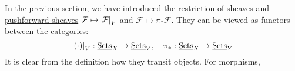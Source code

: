 \documentclass{article}
\begin{document}
\begin{remark}
    In the previous section, we have introduced the restriction of sheaves and \hyperref[def: pushforward sheaf]{pushforward sheaves} $\mathcal{F} \mapsto \left.\mathcal{F}\right|_{V}$ and $\mathcal{F} \mapsto \pi_{\ast}\mathcal{F}$. They can be viewed as functors between the categories:
    \[
        \left.(\cdot)\right|_{V}: \underline{\textup{Sets}}_X \to \underline{\textup{Sets}}_V, \quad \pi_{\ast}: \underline{\textup{Sets}}_X \to \underline{\textup{Sets}}_Y
    \]
    It is clear from the definition how they transit objects. For morphisms, 
    
\end{remark}
\end{document}
